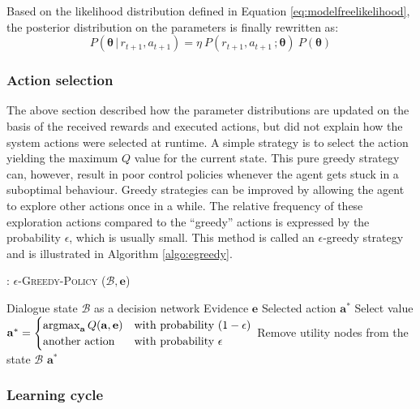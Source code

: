 Based on the likelihood distribution defined in Equation \eqref{eq:modelfreelikelihood}, the posterior distribution on the parameters is finally rewritten as: 
\begin{equation}
P(\boldsymbol\theta \, | \, r_{t+1}, a_{t+1}) = \eta \ P(r_{t+1}, a_{t+1} \,; \boldsymbol\theta)  \ P(\boldsymbol\theta)  \label{eq:posteriormodelfree}
\end{equation}


\subsubsection*{Action selection}

The above section described how the parameter distributions are updated on the basis of the received rewards and executed actions, but did not explain how the system actions were selected at runtime.  A simple strategy is to select the action yielding the maximum $Q$ value for the current state.  This pure greedy strategy can, however, result in poor control policies whenever the agent gets stuck in a suboptimal behaviour.  Greedy strategies can be improved by allowing the agent to explore other actions once in a while. The relative frequency of these exploration actions compared to the  ``greedy'' actions is expressed by the probability $\epsilon$, which is usually small. This method is called an $\epsilon$-greedy strategy and is illustrated in Algorithm \ref{algo:egreedy}.

\begin{algorithm}[h!]
\caption{: \textsc{$\epsilon$-Greedy-Policy} ($\mathcal{B}, \mathbf{e}$)}
\begin{algorithmic}[1] \vspace{1mm}
\REQUIRE Dialogue state $\mathcal{B}$ as a decision network
\REQUIRE Evidence $\mathbf{e}$
\ENSURE Selected action $\mathbf{a}^*$
\STATE Select value $\mathbf{a}^* = \begin{cases} \argmax_{\mathbf{a}} Q(\mathbf{a}, \mathbf{e}) & \text{with probability } (1- \epsilon) \\ \text{another action} & \text{with probability } \epsilon \end{cases}$
\STATE Remove utility nodes from the state $\mathcal{B}$
\RETURN $\mathbf{a}^*$
\end{algorithmic}
\label{algo:egreedy}
\end{algorithm}

\subsubsection*{Learning cycle}

